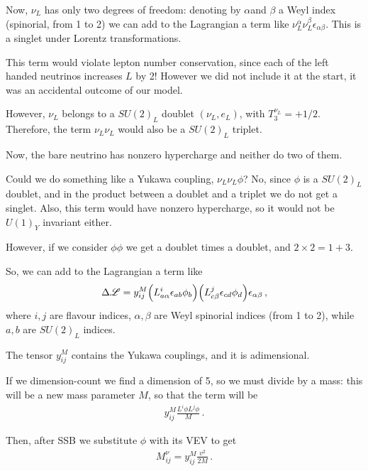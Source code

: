 \documentclass[main.tex]{subfiles}
\begin{document}
Now, \(\nu_{L}\) has only two degrees of freedom: denoting by \(\alpha \)and \(\beta \) a Weyl index (spinorial, from 1 to 2) we can add to the Lagrangian a term like \(\nu_{L}^{\alpha } \nu_{L}^{\beta } \epsilon_{\alpha \beta }\). This is a singlet under Lorentz transformations. 

This term would violate lepton number conservation, since each of the left handed neutrinos increases \(L\) by 2! However we did not include it at the start, it was an accidental outcome of our model. 

However, \(\nu_{L}\) belongs to a \(SU(2)_L\) doublet \((\nu_{L}, e_L)\), with \(T^{\nu_{L}}_{3} = + 1/2\). Therefore, the term \(\nu_{L} \nu_{L}\) would also be a \(SU(2)_L\) triplet. 

Now, the bare neutrino has nonzero hypercharge and neither do two of them. 

Could we do something like a Yukawa coupling, \(\nu_{L} \nu_{L} \phi \)? No, since \(\phi \) is a \(SU(2)_L\) doublet, and in the product between a doublet and a triplet we do not get a singlet. 
Also, this term would have nonzero hypercharge, so it would not be \(U(1)_Y\) invariant either. 

However, if we consider \(\phi \phi \) we get a doublet times a doublet, and \(2 \times 2 = 1 + 3 \). 


So, we can add to the Lagrangian a term like 
%
\begin{align}
\Delta \mathscr{L} = 
y^{M}_{ij}
\qty(L^{i}_{a \alpha } \epsilon_{ab } \phi_{b })
\qty(L^{j}_{c \beta } \epsilon_{cd } \phi_{d })
\epsilon_{\alpha \beta }
\,,
\end{align}
%
where \(i, j\) are flavour indices, \(\alpha , \beta \) are Weyl spinorial indices (from 1 to 2), while \(a, b\) are \(SU(2)_L\) indices.

The tensor \(y^{M}_{ij}\) contains the Yukawa couplings, and it is adimensional. 

If we dimension-count we find a dimension of 5, so we must divide by a mass: this will be a new mass parameter \(M\), so that the term will be 
%
\begin{align}
y^{M}_{ij} \frac{L^{i} \phi L^{j} \phi }{M}
\,.
\end{align}

Then, after SSB we substitute \(\phi \) with its VEV to get 
%
\begin{align}
M^{\nu }_{ij} = y^{M}_{ij} \frac{v^2}{2M}
\,.
\end{align}
\end{document}
